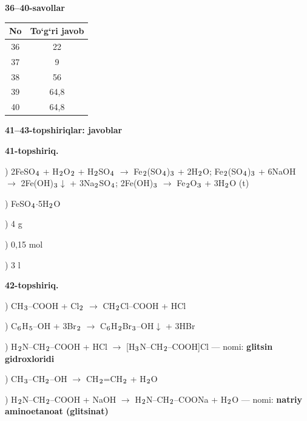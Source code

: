 \documentclass[11pt,a4paper]{article}
\renewcommand{\textsubscript}[1]{\ensuremath{_{\text{\fontsize{8}{8}\selectfont #1}}}}
\begin{document}
\noindent\textbf{36--40-savollar}\par\smallskip
\noindent\begin{tabular}{|c|c|}\hline \textbf{No} & \textbf{To`g`ri javob}\\\hline
36 & 22\\\hline
37 & 9\\\hline
38 & 56\\\hline
39 & 64,8\\\hline
40 & 64,8\\\hline
\end{tabular}\par\medskip
\noindent\textbf{41--43-topshiriqlar: javoblar}\par\smallskip
\noindent\textbf{41-topshiriq.}\par
{}) 2FeSO\textsubscript{4} + H\textsubscript{2}O\textsubscript{2} + H\textsubscript{2}SO\textsubscript{4} $\to$ Fe\textsubscript{2}(SO\textsubscript{4})\textsubscript{3} + 2H\textsubscript{2}O; Fe\textsubscript{2}(SO\textsubscript{4})\textsubscript{3} + 6NaOH $\to$ 2Fe(OH)\textsubscript{3}$\downarrow$ + 3Na\textsubscript{2}SO\textsubscript{4}; 2Fe(OH)\textsubscript{3} $\to$ Fe\textsubscript{2}O\textsubscript{3} + 3H\textsubscript{2}O (t)\par
{}) FeSO\textsubscript{4}$\cdot$5H\textsubscript{2}O\par
{}) 4 g\par
{}) 0,15 mol\par
{}) 3 l\par
\noindent\textbf{42-topshiriq.}\par
{}) CH\textsubscript{3}--COOH + Cl\textsubscript{2} $\to$ CH\textsubscript{2}Cl--COOH + HCl\par
{}) C\textsubscript{6}H\textsubscript{5}--OH + 3Br\textsubscript{2} $\to$ C\textsubscript{6}H\textsubscript{2}Br\textsubscript{3}--OH$\downarrow$ + 3HBr\par
{}) H\textsubscript{2}N--CH\textsubscript{2}--COOH + HCl $\to$ [H\textsubscript{3}N--CH\textsubscript{2}--COOH]Cl --- nomi: \textbf{glitsin gidroxloridi}\par
{}) CH\textsubscript{3}--CH\textsubscript{2}--OH $\to$ CH\textsubscript{2}=CH\textsubscript{2} + H\textsubscript{2}O\par
{}) H\textsubscript{2}N--CH\textsubscript{2}--COOH + NaOH $\to$ H\textsubscript{2}N--CH\textsubscript{2}--COONa + H\textsubscript{2}O --- nomi: \textbf{natriy aminoetanoat (glitsinat)}\par
\end{document}

